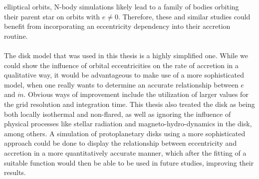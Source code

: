   elliptical orbits, N-body simulations likely lead to a family of bodies 
  orbiting their parent star on orbits with $e\neq0$. Therefore, these and 
  similar studies could benefit from incorporating 
  an eccentricity dependency into their accretion routine. \\
  \\
  The disk model that was used in this thesis is a highly simplified one. 
  While we could show the influence of orbital eccentricities on the rate 
  of accretion in a qualitative way, it would be advantageous to make use of a 
  more sophisticated model, when one really wants to determine an accurate 
  relationship between $e$ and $\dot{m}$.
  Obvious ways of improvement include the 
  utilization of larger values for the grid resolution and integration time.
  This thesis also treated the disk as being both locally isothermal and 
  non-flared, as well as ignoring the influence of physical processes like 
  stellar radiation and magneto-hydro-dynamics in the disk, among others. 
  A simulation of protoplanetary disks using a more sophisticated approach 
  could be done to display the relationship between eccentricity and 
  accretion in a more quantitatively accurate manner, which after the fitting 
  of a suitable function would then be able to be used in future studies, 
  improving their results.




